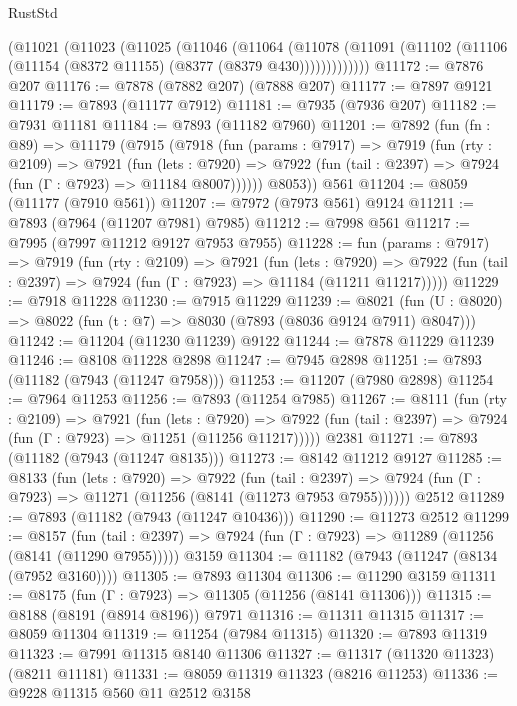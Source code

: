 \begin{lexlean}{RustStd}
\begin{coremodule}
{\begin{coremodule}
{{{{{{{{{{{{{{{{{{{{{{{{{{{{{{{{{{{{{{{{{{{{{{{{{{      (@11021
        (@11023
          (@11025
            (@11046
              (@11064
                (@11078
                  (@11091 (@11102 (@11106 (@11154 (@8372 @11155) (@8377 (@8379 @430)))))))))))))
@11172 := @7876 @207
@11176 := @7878 (@7882 @207) (@7888 @207)
@11177 := @7897 @9121
@11179 := @7893 (@11177 @7912)
@11181 := @7935 (@7936 @207)
@11182 := @7931 @11181
@11184 := @7893 (@11182 @7960)
@11201 := @7892
    (fun (fn : @89) =>
    @11179
      (@7915
        (@7918
          (fun (params : @7917) =>
          @7919
            (fun (rty : @2109) =>
            @7921
              (fun (lets : @7920) =>
              @7922 (fun (tail : @2397) => @7924 (fun (Γ : @7923) => @11184 @8007))))))
        @8053))
    @561
@11204 := @8059 (@11177 (@7910 @561))
@11207 := @7972 (@7973 @561) @9124
@11211 := @7893 (@7964 (@11207 @7981) @7985)
@11212 := @7998 @561
@11217 := @7995 (@7997 @11212 @9127 @7953 @7955)
@11228 := fun (params : @7917) =>
  @7919
    (fun (rty : @2109) =>
    @7921
      (fun (lets : @7920) =>
      @7922 (fun (tail : @2397) => @7924 (fun (Γ : @7923) => @11184 (@11211 @11217)))))
@11229 := @7918 @11228
@11230 := @7915 @11229
@11239 := @8021 (fun (U : @8020) => @8022 (fun (t : @7) => @8030 (@7893 (@8036 @9124 @7911) @8047)))
@11242 := @11204 (@11230 @11239) @9122
@11244 := @7878 @11229 @11239
@11246 := @8108 @11228 @2898
@11247 := @7945 @2898
@11251 := @7893 (@11182 (@7943 (@11247 @7958)))
@11253 := @11207 (@7980 @2898)
@11254 := @7964 @11253
@11256 := @7893 (@11254 @7985)
@11267 := @8111
    (fun (rty : @2109) =>
    @7921
      (fun (lets : @7920) =>
      @7922 (fun (tail : @2397) => @7924 (fun (Γ : @7923) => @11251 (@11256 @11217)))))
    @2381
@11271 := @7893 (@11182 (@7943 (@11247 @8135)))
@11273 := @8142 @11212 @9127
@11285 := @8133
    (fun (lets : @7920) =>
    @7922
      (fun (tail : @2397) =>
      @7924 (fun (Γ : @7923) => @11271 (@11256 (@8141 (@11273 @7953 @7955))))))
    @2512
@11289 := @7893 (@11182 (@7943 (@11247 @10436)))
@11290 := @11273 @2512
@11299 := @8157
    (fun (tail : @2397) => @7924 (fun (Γ : @7923) => @11289 (@11256 (@8141 (@11290 @7955)))))
    @3159
@11304 := @11182 (@7943 (@11247 (@8134 (@7952 @3160))))
@11305 := @7893 @11304
@11306 := @11290 @3159
@11311 := @8175 (fun (Γ : @7923) => @11305 (@11256 (@8141 @11306)))
@11315 := @8188 (@8191 (@8914 @8196)) @7971
@11316 := @11311 @11315
@11317 := @8059 @11304
@11319 := @11254 (@7984 @11315)
@11320 := @7893 @11319
@11323 := @7991 @11315 @8140 @11306
@11327 := @11317 (@11320 @11323) (@8211 @11181)
@11331 := @8059 @11319 @11323 (@8216 @11253)
@11336 := @9228 @11315 @560 @11 @2512 @3158
}}}}}}}}}}}}}}}}}}}}}}}}}}}}}}}}}}}}}}}}}}}}}}}}}}
\end{coremodule}}
\end{coremodule}
\end{lexlean}
